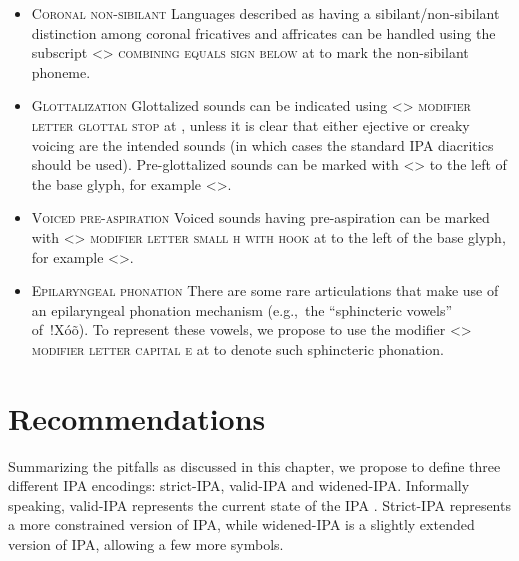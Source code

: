 \begin{itemize}
\item \textsc{Coronal non-sibilant} \newline
      Languages described as having a sibilant/non-sibilant distinction among
      coronal fricatives and affricates can be handled using the subscript
      <> \textsc{combining equals sign below} at  to mark
      the non-sibilant phoneme.
\item \textsc{Glottalization} \newline 
      Glottalized sounds can be indicated using
      <> \textsc{modifier letter glottal stop} at , unless
      it is clear that either ejective or creaky voicing are the
      intended sounds (in which cases the standard IPA diacritics should be
      used). Pre-glottalized sounds can be marked with
      <> to the left of the base
      glyph, for example <>.
\item \textsc{Voiced pre-aspiration} \newline Voiced sounds having
      pre-aspiration can be marked with
      <> \textsc{modifier letter
      small h with hook} at  to the left of the base glyph, for
      example <>.
\item \textsc{Epilaryngeal phonation} \newline 
      There are some rare articulations that make
      use of an epilaryngeal phonation mechanism (e.g.,~the “sphincteric vowels”
      of~!Xóõ). To represent these vowels, we propose to use the modifier <>
      \textsc{modifier letter capital e} at  to denote such sphincteric
      phonation.

\end{itemize}


\section{Recommendations}
\label{ipa-recommendations}


Summarizing the pitfalls as discussed in this chapter, we propose to define
three different IPA encodings: strict-IPA, valid-IPA and widened-IPA.\@
Informally speaking, valid-IPA represents the current state of the IPA
\citep{IPA2005}. Strict-IPA represents a more constrained version of IPA, while
widened-IPA is a slightly extended version of IPA, allowing a few more symbols.

